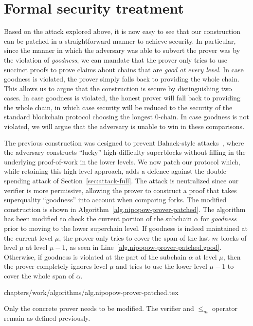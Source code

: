 \section{Formal security treatment}
\label{sec:security-full}

Based on the attack explored above, it is now easy to see that our construction
can be patched in a straightforward manner to achieve security. In particular,
since the manner in which the adversary was able to subvert the prover was by
the violation of \emph{goodness}, we can mandate that the prover only tries to
use succinct proofs to prove claims about chains that are
\emph{good at every level}. In case goodness is violated, the prover simply
falls back to providing the whole chain. This allows us to argue that the
construction is secure by distinguishing two cases. In case goodness is
violated, the honest prover will fall back to providing the whole chain, in
which case security will be reduced to the security of the standard
blockchain protocol choosing the longest $0$-chain. In case goodness is not
violated, we will argue that the adversary is unable to win in these
comparisons.

The previous construction was designed to prevent Bahack-style
attacks~\cite{bahack}, where the adversary constructs ``lucky'' high-difficulty
superblocks without filling in the underlying proof-of-work in the lower levels.
We now patch our protocol which, while retaining this high level approach, adds
a defence against the double-spending attack of Section~\ref{sec:attack-full}. The
attack is neutralized since our verifier is more permissive, allowing the prover
to construct a proof that takes superquality ``goodness'' into account when
comparing forks. The modified construction is shown in
Algorithm~\ref{alg.nipopow-prover-patched}. The algorithm has been modified to
check the current portion of the subchain $\alpha$ for \emph{goodness} prior to
moving to the lower superchain level. If goodness is indeed maintained at the
current level $\mu$, the prover only tries to cover the span of the last $m$
blocks of level $\mu$ at level $\mu - 1$, as seen in
Line~\ref{alg.nipopow-prover-patched.good}. Otherwise, if goodness is violated
at the part of the subchain $\alpha$ at level $\mu$, then the prover completely
ignores level $\mu$ and tries to use the lower level $\mu - 1$ to cover the
whole span of $\alpha$.

{chapters/work/algorithms/alg.nipopow-prover-patched.tex}

Only the concrete prover needs to be modified. The verifier and $\leq_m$
operator remain as defined previously.

